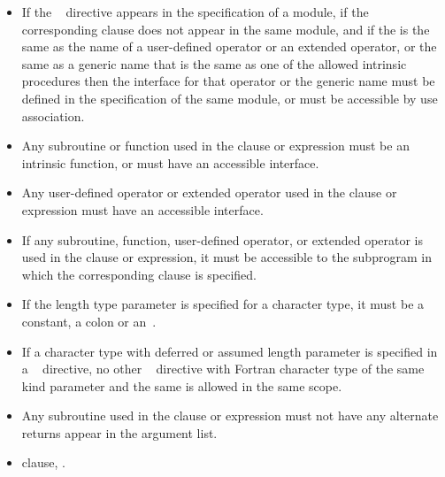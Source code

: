 {{{{\begin{itemize}
\item If the ~ directive appears in the specification of a module, if the corresponding  clause does not appear in the same module, and if the  is the same as the name of a user-defined operator or an extended operator, or the same as a generic name that is the same as one of the allowed intrinsic procedures then the interface for that operator or the generic name must be defined in the specification of the same module, or must be accessible by use association. 

\item Any subroutine or function used in the  clause or  expression must be an intrinsic function, or must have an accessible interface. 

\item Any user-defined operator or extended operator used in the  clause or  expression must have an accessible interface. 

\item If any subroutine, function, user-defined operator, or extended operator is used in the  clause or  expression, it must be accessible to the subprogram in which the corresponding  clause is specified. 

\item If the length type parameter is specified for a character type, it must be a constant, a colon or an~\code{*}. 

\item If a character type with deferred or assumed length parameter is specified in a ~ directive, no other ~ directive with Fortran character type of the same kind parameter and the same  is allowed in the same scope.

\item Any subroutine used in the  clause or  expression must not have any alternate returns appear in the argument list.
\fortranspecificend
\end{itemize}

\crossreferences
\begin{itemize}
\item {} clause, 
.
\end{itemize}










}}}}
